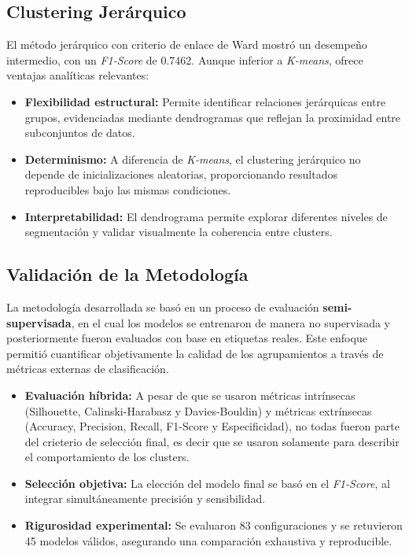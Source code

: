 \documentclass[12pt,a4paper]{article}
\begin{document}
\vspace{1em}

\subsection{Clustering Jerárquico}

El método jerárquico con criterio de enlace de Ward mostró un desempeño intermedio, con un \textit{F1-Score} de 0.7462. 
Aunque inferior a \textit{K-means}, ofrece ventajas analíticas relevantes:

\begin{itemize}
    \item \textbf{Flexibilidad estructural:} Permite identificar relaciones jerárquicas entre grupos, evidenciadas mediante dendrogramas que reflejan la proximidad entre subconjuntos de datos.
    \item \textbf{Determinismo:} A diferencia de \textit{K-means}, el clustering jerárquico no depende de inicializaciones aleatorias, proporcionando resultados reproducibles bajo las mismas condiciones.
    \item \textbf{Interpretabilidad:} El dendrograma permite explorar diferentes niveles de segmentación y validar visualmente la coherencia entre clusters.
\end{itemize}

\vspace{1em}

\subsection{Validación de la Metodología}

La metodología desarrollada se basó en un proceso de evaluación \textbf{semi-supervisada}, en el cual los modelos se entrenaron de manera no supervisada y posteriormente fueron evaluados con base en etiquetas reales. 
Este enfoque permitió cuantificar objetivamente la calidad de los agrupamientos a través de métricas externas de clasificación.

\begin{itemize}
    \item \textbf{Evaluación híbrida:} A pesar de que se usaron métricas intrínsecas (Silhouette, Calinski-Harabasz y Davies-Bouldin) y métricas extrínsecas (Accuracy, Precision, Recall, F1-Score y Especificidad), no todas fueron parte del crieterio de selección final, es decir que se usaron solamente para describir el comportamiento de los clusters.
    \item \textbf{Selección objetiva:} La elección del modelo final se basó en el \textit{F1-Score}, al integrar simultáneamente precisión y sensibilidad.
    \item \textbf{Rigurosidad experimental:} Se evaluaron 83 configuraciones y se retuvieron 45 modelos válidos, asegurando una comparación exhaustiva y reproducible.
\end{itemize}
\end{document}
